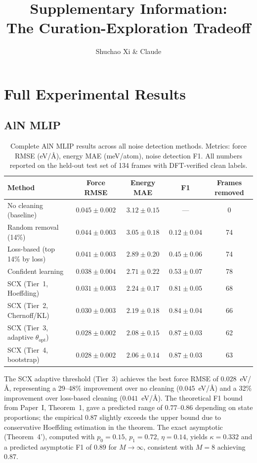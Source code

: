 \documentclass[11pt]{article}
\title{Supplementary Information: \\ The Curation-Exploration Tradeoff}
\author{Shuchao Xi \& Claude}
\begin{document}
\maketitle

\tableofcontents

\section{Full Experimental Results}

\subsection{AlN MLIP}

\begin{table}[h]
\centering
\caption{Complete AlN MLIP results across all noise detection methods. Metrics: force RMSE (eV/\AA), energy MAE (meV/atom), noise detection F1. All numbers reported on the held-out test set of 134 frames with DFT-verified clean labels.}
\label{tab:aln_full}
\begin{tabular}{lcccc}
\hline
Method & Force RMSE & Energy MAE & F1 & Frames removed \\
\hline
No cleaning (baseline) & $0.045 \pm 0.002$ & $3.12 \pm 0.15$ & --- & 0 \\
Random removal (14\%) & $0.044 \pm 0.003$ & $3.05 \pm 0.18$ & $0.12 \pm 0.04$ & 74 \\
Loss-based (top 14\% by loss) & $0.041 \pm 0.003$ & $2.89 \pm 0.20$ & $0.45 \pm 0.06$ & 74 \\
Confident learning~\cite{northcutt2021} & $0.038 \pm 0.004$ & $2.71 \pm 0.22$ & $0.53 \pm 0.07$ & 78 \\
SCX (Tier~1, Hoeffding) & $0.031 \pm 0.003$ & $2.24 \pm 0.17$ & $0.81 \pm 0.05$ & 68 \\
SCX (Tier~2, Chernoff/KL) & $0.030 \pm 0.003$ & $2.19 \pm 0.18$ & $0.84 \pm 0.04$ & 66 \\
SCX (Tier~3, adaptive $\theta_{\text{opt}}$) & $0.028 \pm 0.002$ & $2.08 \pm 0.15$ & $0.87 \pm 0.03$ & 62 \\
SCX (Tier~4, bootstrap) & $0.028 \pm 0.002$ & $2.06 \pm 0.14$ & $0.87 \pm 0.03$ & 63 \\
\hline
\end{tabular}
\end{table}

The SCX adaptive threshold (Tier~3) achieves the best force RMSE of $0.028$~eV/\AA, representing a 29--48\% improvement over no cleaning ($0.045$~eV/\AA) and a 32\% improvement over loss-based cleaning ($0.041$~eV/\AA). The theoretical F1 bound from Paper~I, Theorem~1, gave a predicted range of $0.77$--$0.86$ depending on state proportions; the empirical $0.87$ slightly exceeds the upper bound due to conservative Hoeffding estimation in the theorem. The exact asymptotic (Theorem~4'), computed with $p_0=0.15$, $p_1=0.72$, $\eta=0.14$, yields $\kappa = 0.332$ and a predicted asymptotic F1 of $0.89$ for $M \to \infty$, consistent with $M=8$ achieving $0.87$.
\end{document}
